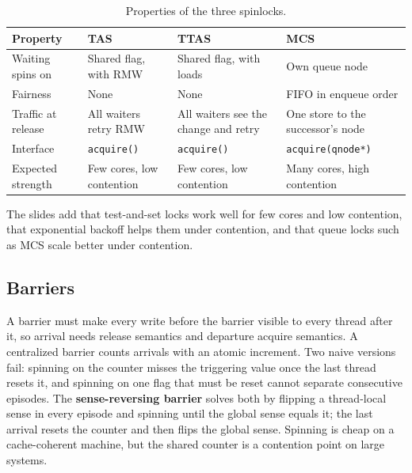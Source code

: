 \begin{table}[H]
\centering
\small
\caption{Properties of the three spinlocks.}\label{tab:lock-props}
\begin{tabular}{|>{\raggedright\arraybackslash}p{}|>{\raggedright\arraybackslash}p{}|>{\raggedright\arraybackslash}p{}|>{\raggedright\arraybackslash}p{}|}
\hline
\textbf{Property} & \textbf{TAS} & \textbf{TTAS} & \textbf{MCS} \\ \hline
Waiting spins on & Shared flag, with RMW & Shared flag, with loads & Own queue node \\ \hline
Fairness & None & None & FIFO in enqueue order \\ \hline
Traffic at release & All waiters retry RMW & All waiters see the change and retry & One store to the successor's node \\ \hline
Interface & \texttt{acquire()} & \texttt{acquire()} & \texttt{acquire(qnode*)} \\ \hline
Expected strength & Few cores, low contention & Few cores, low contention & Many cores, high contention \\ \hline
\end{tabular}
\end{table}

The slides add that test-and-set locks work well for few cores and low contention, that exponential backoff helps them under contention, and that queue locks such as MCS scale better under contention.

\subsection{Barriers}\label{sec:bg-barrier}

A barrier must make every write before the barrier visible to every thread after it, so arrival needs release semantics and departure acquire semantics. A centralized barrier counts arrivals with an atomic increment. Two naive versions fail: spinning on the counter misses the triggering value once the last thread resets it, and spinning on one flag that must be reset cannot separate consecutive episodes. The \textbf{sense-reversing barrier} solves both by flipping a thread-local sense in every episode and spinning until the global sense equals it; the last arrival resets the counter and then flips the global sense. Spinning is cheap on a cache-coherent machine, but the shared counter is a contention point on large systems.

